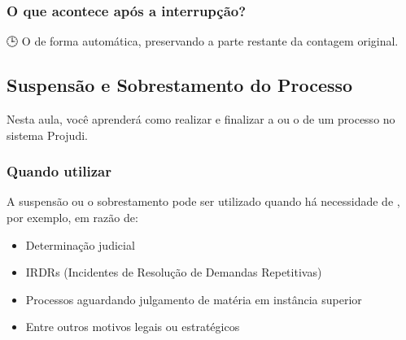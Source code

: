 \documentclass[letterpaper,10pt,brazil]{sphinxmanual}
\begin{document}
\subsubsection{O que acontece após a interrupção?}
\label{\detokenize{projud_38_interrupcaoprazo:o-que-acontece-apos-a-interrupcao}}
\sphinxAtStartPar
🕒 O  de forma automática, preservando a parte restante da contagem original.

\sphinxstepscope


\subsection{Suspensão e Sobrestamento do Processo}
\label{\detokenize{projud_39_suspensaosobrestamento:suspensao-e-sobrestamento-do-processo}}\label{\detokenize{projud_39_suspensaosobrestamento::doc}}
\sphinxAtStartPar
Nesta aula, você aprenderá como realizar e finalizar a  ou o  de um processo no sistema Projudi.


\subsubsection{Quando utilizar}
\label{\detokenize{projud_39_suspensaosobrestamento:quando-utilizar}}
\sphinxAtStartPar
A suspensão ou o sobrestamento pode ser utilizado quando há necessidade de , por exemplo, em razão de:
\begin{itemize}
\item {} 
\sphinxAtStartPar
Determinação judicial

\item {} 
\sphinxAtStartPar
IRDRs (Incidentes de Resolução de Demandas Repetitivas)

\item {} 
\sphinxAtStartPar
Processos aguardando julgamento de matéria em instância superior

\item {} 
\sphinxAtStartPar
Entre outros motivos legais ou estratégicos

\end{itemize}
\end{document}
